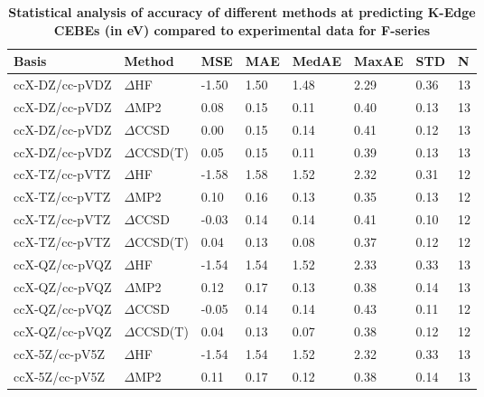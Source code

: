 \begin{table}
  \caption{\textbf{Statistical analysis of accuracy of different methods at predicting K-Edge CEBEs (in eV) compared to experimental data for F-series}}
  \begin{tabular}{l l l l l l l l }
    \toprule
    \textbf{Basis} & \textbf{Method} & \textbf{MSE} & \textbf{MAE} & \textbf{MedAE} & \textbf{MaxAE} & \textbf{STD} & \textbf{N} \\ 
    \midrule
    ccX-DZ/cc-pVDZ & $\Delta$HF & -1.50 & 1.50 & 1.48 & 2.29 & 0.36 & 13 \\ 
    ccX-DZ/cc-pVDZ & $\Delta$MP2 & 0.08 & 0.15 & 0.11 & 0.40 & 0.13 & 13 \\ 
    ccX-DZ/cc-pVDZ & $\Delta$CCSD & 0.00 & 0.15 & 0.14 & 0.41 & 0.12 & 13 \\ 
    ccX-DZ/cc-pVDZ & $\Delta$CCSD(T) & 0.05 & 0.15 & 0.11 & 0.39 & 0.13 & 13 \\ 
    ccX-TZ/cc-pVTZ & $\Delta$HF & -1.58 & 1.58 & 1.52 & 2.32 & 0.31 & 12 \\ 
    ccX-TZ/cc-pVTZ & $\Delta$MP2 & 0.10 & 0.16 & 0.13 & 0.35 & 0.13 & 12 \\ 
    ccX-TZ/cc-pVTZ & $\Delta$CCSD & -0.03 & 0.14 & 0.14 & 0.41 & 0.10 & 12 \\ 
    ccX-TZ/cc-pVTZ & $\Delta$CCSD(T) & 0.04 & 0.13 & 0.08 & 0.37 & 0.12 & 12 \\ 
    ccX-QZ/cc-pVQZ & $\Delta$HF & -1.54 & 1.54 & 1.52 & 2.33 & 0.33 & 13 \\ 
    ccX-QZ/cc-pVQZ & $\Delta$MP2 & 0.12 & 0.17 & 0.13 & 0.38 & 0.14 & 13 \\ 
    ccX-QZ/cc-pVQZ & $\Delta$CCSD & -0.05 & 0.14 & 0.14 & 0.43 & 0.11 & 12 \\ 
    ccX-QZ/cc-pVQZ & $\Delta$CCSD(T) & 0.04 & 0.13 & 0.07 & 0.38 & 0.12 & 12 \\ 
    ccX-5Z/cc-pV5Z & $\Delta$HF & -1.54 & 1.54 & 1.52 & 2.32 & 0.33 & 13 \\ 
    ccX-5Z/cc-pV5Z & $\Delta$MP2 & 0.11 & 0.17 & 0.12 & 0.38 & 0.14 & 13 \\ 
    \bottomrule
  \end{tabular}
\end{table}
